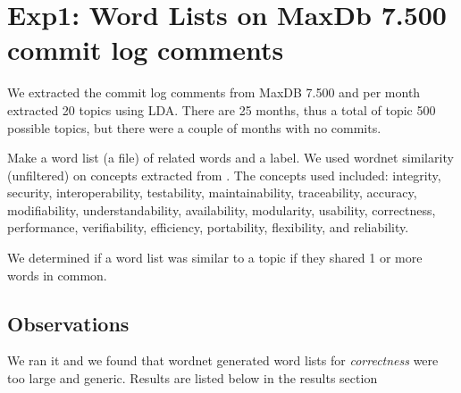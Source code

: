 \documentclass{article}
\begin{document}









\section{Exp1: Word Lists on MaxDb 7.500 commit log comments}

We extracted the commit log comments from MaxDB 7.500 and per month extracted 20 topics using LDA. There are 25 months, thus a total of topic 500 possible topics, but there were a couple of months with no commits.

Make a word list (a file) of related words and a label. We used
wordnet similarity (unfiltered) on concepts extracted from
\cite{5072519}.  The concepts used included: integrity, security,
interoperability, testability, maintainability, traceability,
accuracy, modifiability, understandability, availability, modularity,
usability, correctness, performance, verifiability, efficiency,
portability, flexibility, and reliability.

We determined if a word list was similar to a topic if they shared 1
or more words in common.

\subsection{Observations}

We ran it and we found that wordnet generated word lists for
\emph{correctness} were too large and generic. Results are listed below
in the results section
\end{document}
